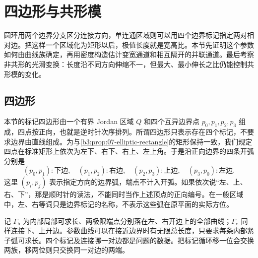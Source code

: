 \section{四边形与共形模}
\label{b3:sec:0804}

圆环用两个边界分支区分连接方向，单连通区域则可以用四个边界标记指定两对相对边。把这样一个区域化为矩形以后，极值长度就是宽高比。本节先证明这个参数如何由曲线族确定，再用密度构造估计变宽通道和相互隔开的并联通道。最后考察非共形的光滑变换：长度沿不同方向伸缩不一，但最大、最小伸长之比仍能控制共形模的变化。

\subsection{四边形}
\label{b3:subsec:080401}

本节的标记四边形由一个有界 Jordan 区域 \(Q\) 和四个互异边界点 \(p_0,p_1,p_2,p_3\) 组成，四点按正向，也就是逆时针次序排列。所谓四边形只表示存在四个标记，不要求边界由直线组成。为与\cref{b3:prop:07-elliptic-rectangle}的矩形保持一致，我们规定四点在标准矩形上依次为左下、右下、右上、左上角。于是沿正向边界的四条开弧分别是
\[
 (p_0,p_1):\text{下边},\quad
 (p_1,p_2):\text{右边},\quad
 (p_2,p_3):\text{上边},\quad
 (p_3,p_0):\text{左边}.
\]
这里 \((p_i,p_j)\) 表示指定方向的边界弧，端点不计入开弧。如果依次说“左、上、右、下”，那是顺时针的读法，不能同时当作上述顶点的正向编号。在一般区域中，左、右等词只是边界标记的名称，不表示这些弧在原平面的实际方位。

\ProseParagraphBreak
记 \(\Gamma_{\mathrm h}\) 为内部局部可求长、两极限端点分别落在左、右开边上的全部曲线；\(\Gamma_{\mathrm v}\) 同样连接下、上开边。参数曲线可以在接近边界时有无限总长度，只要求每条内部紧子弧可求长。四个标记及连接哪一对边都是问题的数据。把标记循环移一位会交换两族，移两位则只交换同一对边的两端。

